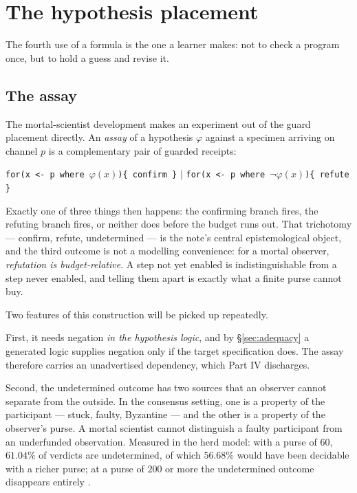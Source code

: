 \section{The hypothesis placement}
\label{sec:hypothesis}

The fourth use of a formula is the one a learner makes: not to check a program
once, but to hold a guess and revise it.

\subsection{The assay}

The mortal-scientist development \cite{ScientistNote} makes an experiment out of
the guard placement directly. An \emph{assay} of a hypothesis $\varphi$ against a
specimen arriving on channel $p$ is a complementary pair of guarded receipts:
\begin{center}
\texttt{for(x <- p where }$\varphi(x)$\texttt{)\{ confirm \}}
\quad $\mid$ \quad
\texttt{for(x <- p where }$\lnot\varphi(x)$\texttt{)\{ refute \}}
\end{center}
Exactly one of three things then happens: the confirming branch fires, the
refuting branch fires, or neither does before the budget runs out. That
trichotomy --- confirm, refute, undetermined --- is the note's central
epistemological object, and the third outcome is not a modelling convenience: for
a mortal observer, \emph{refutation is budget-relative}. A step not yet enabled is
indistinguishable from a step never enabled, and telling them apart is exactly
what a finite purse cannot buy.

Two features of this construction will be picked up repeatedly.

First, it needs negation \emph{in the hypothesis logic}, and by
\S\ref{sec:adequacy} a generated logic supplies negation only if the target
specification does. The assay therefore carries an unadvertised dependency, which
Part IV discharges.

Second, the undetermined outcome has two sources that an observer cannot separate
from the outside. In the consensus setting, one is a property of the participant
--- stuck, faulty, Byzantine --- and the other is a property of the observer's
purse. A mortal scientist cannot distinguish a faulty participant from an
underfunded observation. Measured in the herd model: with a purse of $60$, $61.04\%$
of verdicts are undetermined, of which $56.68\%$ would have been decidable with a
richer purse; at a purse of $200$ or more the undetermined outcome disappears
entirely \cite{QuorumNote}.

